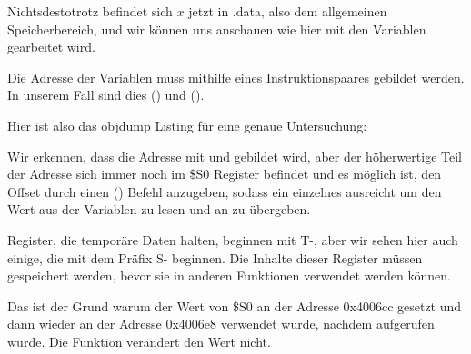 Nichtsdestotrotz befindet sich $x$ jetzt in .data, also dem allgemeinen Speicherbereich, und wir können uns anschauen
wie hier mit den Variablen gearbeitet wird.


Die Adresse der Variablen muss mithilfe eines Instruktionspaares gebildet werden.
In unserem Fall sind dies  () und  ().

Hier ist also das objdump Listing für eine genaue Untersuchung:



Wir erkennen, dass die Adresse mit  und  gebildet wird, aber der höherwertige Teil der Adresse sich
immer noch im \$S0 Register befindet und es möglich ist, den Offset durch einen  () Befehl
anzugeben, sodass ein einzelnes  ausreicht um den Wert aus der Variablen zu lesen und an \printf zu übergeben.

Register, die temporäre Daten halten, beginnen mit T-, aber wir sehen hier auch einige, die mit dem Präfix S- beginnen.
Die Inhalte dieser Register müssen gespeichert werden, bevor sie in anderen Funktionen verwendet werden können.

Das ist der Grund warum der Wert von \$S0 an der Adresse 0x4006cc gesetzt und dann wieder an der Adresse 0x4006e8
verwendet wurde, nachdem \scanf aufgerufen wurde. Die Funktion \scanf verändert den Wert nicht.


